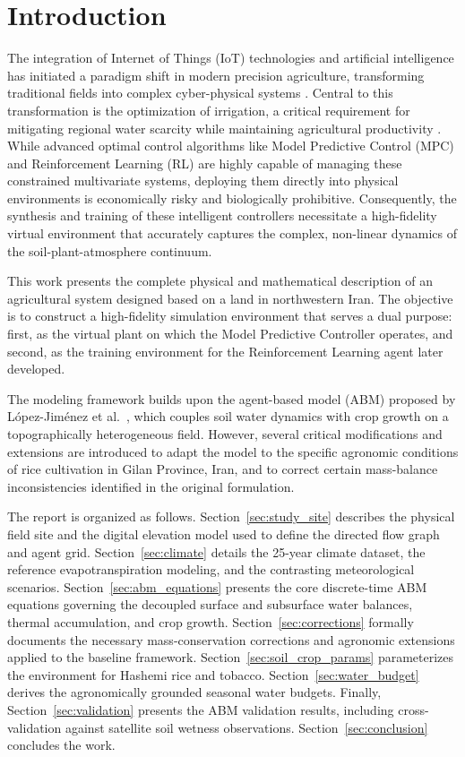 \section{Introduction}
\label{sec:introduction}

The integration of Internet of Things (IoT) technologies and artificial intelligence has initiated a paradigm shift in modern precision agriculture, transforming traditional fields into complex cyber-physical systems \cite{Bayar2025, PourgholamAmiji2024}. Central to this transformation is the optimization of irrigation, a critical requirement for mitigating regional water scarcity while maintaining agricultural productivity \cite{Nouri2023, Maniam2026}. While advanced optimal control algorithms like Model Predictive Control (MPC) and Reinforcement Learning (RL) are highly capable of managing these constrained multivariate systems, deploying them directly into physical environments is economically risky and biologically prohibitive. Consequently, the synthesis and training of these intelligent controllers necessitate a high-fidelity virtual environment that accurately captures the complex, non-linear dynamics of the soil-plant-atmosphere continuum.

This work presents the complete physical and mathematical description of an agricultural system designed based on a land in northwestern Iran. The objective is to construct a high-fidelity simulation environment that serves a dual purpose: first, as the virtual plant on which the Model Predictive Controller operates, and second, as the training environment for the Reinforcement Learning agent later developed.

The modeling framework builds upon the agent-based model (ABM) proposed by L\'{o}pez-Jim\'{e}nez et al.~\cite{Lopezjimenez2024}, which couples soil water dynamics with crop growth on a topographically heterogeneous field. However, several critical modifications and extensions are introduced to adapt the model to the specific agronomic conditions of rice cultivation in Gilan Province, Iran, and to correct certain mass-balance inconsistencies identified in the original formulation.

The report is organized as follows. Section~\ref{sec:study_site} describes the physical field site and the digital elevation model used to define the directed flow graph and agent grid. Section~\ref{sec:climate} details the 25-year climate dataset, the reference evapotranspiration modeling, and the contrasting meteorological scenarios. Section~\ref{sec:abm_equations} presents the core discrete-time ABM equations governing the decoupled surface and subsurface water balances, thermal accumulation, and crop growth. Section~\ref{sec:corrections} formally documents the necessary mass-conservation corrections and agronomic extensions applied to the baseline framework. Section~\ref{sec:soil_crop_params} parameterizes the environment for Hashemi rice and tobacco. Section~\ref{sec:water_budget} derives the agronomically grounded seasonal water budgets. Finally, Section~\ref{sec:validation} presents the ABM validation results, including cross-validation against satellite soil wetness observations. Section~\ref{sec:conclusion} concludes the work.


